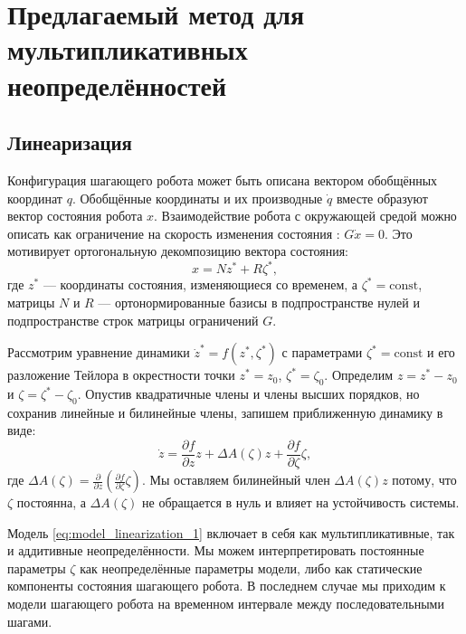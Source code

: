 \chapter{Предлагаемый метод для мультипликативных неопределённостей}\label{ch:ch3}
\section{Линеаризация}\label{sec:ch3/sect1}
Конфигурация шагающего робота может быть описана вектором обобщённых координат $q$. Обобщённые координаты и их производные $\dot q$ вместе образуют вектор состояния робота $x$. Взаимодействие робота с окружающей средой можно описать как ограничение на скорость изменения состояния \cite{mason2014full}: ${G} \dot x = 0$. Это мотивирует ортогональную декомпозицию вектора состояния:
%
\begin{equation}
	x = {N} z^* + {R} \zeta^* ,
\end{equation}
%
где $z^*$ --- координаты состояния, изменяющиеся со временем, а $\zeta^* = \text{const}$, матрицы ${N}$ и ${R}$ --- ортонормированные базисы в подпространстве нулей и подпространстве строк матрицы ограничений ${G}$.

Рассмотрим уравнение динамики $\dot z^* = f(z^*, \zeta^*)$ с параметрами $\zeta^* = \text{const}$ и его разложение Тейлора в окрестности точки $z^* = z_0$, $\zeta^* = \zeta_0$. Определим $z = z^* - z_0$ и $\zeta = \zeta^* - \zeta_0$.
Опустив квадратичные члены и члены высших порядков, но сохранив линейные и билинейные члены, запишем приближенную динамику в виде:
%
\begin{equation}
	\label{eq:model_linearization_1}
	\dot z = \frac{\partial f}{\partial z} z + \Delta {A}(\zeta) z + \frac{\partial f}{\partial \zeta} \zeta ,
\end{equation}
%
где $\Delta {A}(\zeta) = \frac{\partial}{\partial z} (\frac{\partial f}{\partial \zeta} \zeta)$. Мы оставляем билинейный член $\Delta {A}(\zeta) z$ потому, что $\zeta$ постоянна, а $\Delta {A}(\zeta)$ не обращается в нуль и влияет на устойчивость системы.

Модель \eqref{eq:model_linearization_1} включает в себя как мультипликативные, так и аддитивные неопределённости. Мы можем интерпретировать постоянные параметры $\zeta$ как неопределённые параметры модели, либо как статические компоненты состояния шагающего робота. В последнем случае мы приходим к модели шагающего робота на временном интервале между последовательными шагами.

